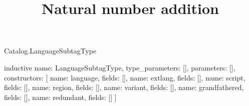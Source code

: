 \begin{lexlean}{Catalog.LanguageSubtagType}
\title{Natural number addition}
\begin{semanticmodule}
inductive{
  name: LanguageSubtagType,
  type_parameters: [],
  parameters: [],
  constructors: [
    {name: language, fields: []},
    {name: extlang, fields: []},
    {name: script, fields: []},
    {name: region, fields: []},
    {name: variant, fields: []},
    {name: grandfathered, fields: []},
    {name: redundant, fields: []}
  ]
}
\end{semanticmodule}
\end{lexlean}
